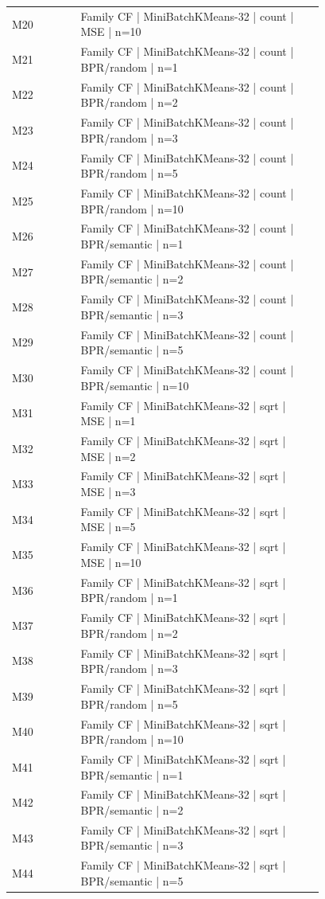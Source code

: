 \begin{longtable}{lp{0.78\linewidth}}
M20 & Family CF | MiniBatchKMeans-32 | count | MSE | n=10 \\
M21 & Family CF | MiniBatchKMeans-32 | count | BPR/random | n=1 \\
M22 & Family CF | MiniBatchKMeans-32 | count | BPR/random | n=2 \\
M23 & Family CF | MiniBatchKMeans-32 | count | BPR/random | n=3 \\
M24 & Family CF | MiniBatchKMeans-32 | count | BPR/random | n=5 \\
M25 & Family CF | MiniBatchKMeans-32 | count | BPR/random | n=10 \\
M26 & Family CF | MiniBatchKMeans-32 | count | BPR/semantic | n=1 \\
M27 & Family CF | MiniBatchKMeans-32 | count | BPR/semantic | n=2 \\
M28 & Family CF | MiniBatchKMeans-32 | count | BPR/semantic | n=3 \\
M29 & Family CF | MiniBatchKMeans-32 | count | BPR/semantic | n=5 \\
M30 & Family CF | MiniBatchKMeans-32 | count | BPR/semantic | n=10 \\
M31 & Family CF | MiniBatchKMeans-32 | sqrt | MSE | n=1 \\
M32 & Family CF | MiniBatchKMeans-32 | sqrt | MSE | n=2 \\
M33 & Family CF | MiniBatchKMeans-32 | sqrt | MSE | n=3 \\
M34 & Family CF | MiniBatchKMeans-32 | sqrt | MSE | n=5 \\
M35 & Family CF | MiniBatchKMeans-32 | sqrt | MSE | n=10 \\
M36 & Family CF | MiniBatchKMeans-32 | sqrt | BPR/random | n=1 \\
M37 & Family CF | MiniBatchKMeans-32 | sqrt | BPR/random | n=2 \\
M38 & Family CF | MiniBatchKMeans-32 | sqrt | BPR/random | n=3 \\
M39 & Family CF | MiniBatchKMeans-32 | sqrt | BPR/random | n=5 \\
M40 & Family CF | MiniBatchKMeans-32 | sqrt | BPR/random | n=10 \\
M41 & Family CF | MiniBatchKMeans-32 | sqrt | BPR/semantic | n=1 \\
M42 & Family CF | MiniBatchKMeans-32 | sqrt | BPR/semantic | n=2 \\
M43 & Family CF | MiniBatchKMeans-32 | sqrt | BPR/semantic | n=3 \\
M44 & Family CF | MiniBatchKMeans-32 | sqrt | BPR/semantic | n=5 \\

\end{longtable}
